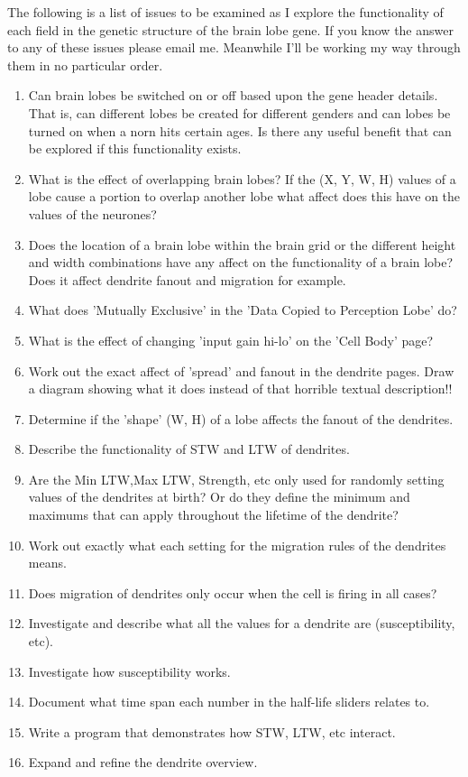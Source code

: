 \documentclass[11pt,twoside,a4paper]{article}
\begin{document}
The following is a list of issues to be examined as I explore the functionality of each field in the genetic structure of the brain lobe gene. If you know the answer to any of these issues please email me. Meanwhile I'll be working my way through them in no particular order.
\begin{enumerate}
	\item Can brain lobes be switched on or off based upon the gene header details. That is, can different lobes be created for different genders and can lobes be turned on when a norn hits certain ages. Is there any useful benefit that can be explored if this functionality exists.
	\item What is the effect of overlapping brain lobes? If the (X, Y, W, H) values of a lobe cause a portion to overlap another lobe what affect does this have on the values of the neurones?
	\item Does the location of a brain lobe within the brain grid or the different height and width combinations have any affect on the functionality of a brain lobe? Does it affect dendrite fanout and migration for example.
	\item What does 'Mutually Exclusive' in the 'Data Copied to Perception Lobe' do?
	\item What is the effect of changing 'input gain hi-lo' on the 'Cell Body' page?
	\item Work out the exact affect of 'spread' and fanout in the dendrite pages. Draw a diagram showing what it does instead of that horrible textual description!!
	\item Determine if the 'shape' (W, H) of a lobe affects the fanout of the dendrites.
	\item Describe the functionality of STW and LTW of dendrites.
	\item Are the Min LTW,Max LTW, Strength, etc only used for randomly setting values of the dendrites at birth? Or do they define the minimum and maximums that can apply throughout the lifetime of the dendrite?
	\item Work out exactly what each setting for the migration rules of the dendrites means.
	\item Does migration of dendrites only occur when the cell is firing in all cases?
	\item Investigate and describe what all the values for a dendrite are (susceptibility, etc).
	\item Investigate how susceptibility works.
	\item Document what time span each number in the half-life sliders relates to.
	\item Write a program that demonstrates how STW, LTW, etc interact.
	\item Expand and refine the dendrite overview.
\end{enumerate} %
\end{document}
